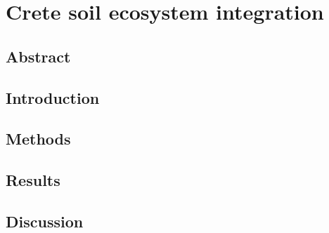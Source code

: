 % 
% 


\chapter{Crete soil ecosystem integration}
\label{cha:crete-soil}


%



\section{Abstract}

\section{Introduction}
\label{sec:crete-soil-intro}

\section{Methods}
\label{sec:crete-soil-method}

\section{Results}
\label{sec:crete-soil-results}

\section{Discussion}
\label{sec:crete-soil-discussion}

% 
